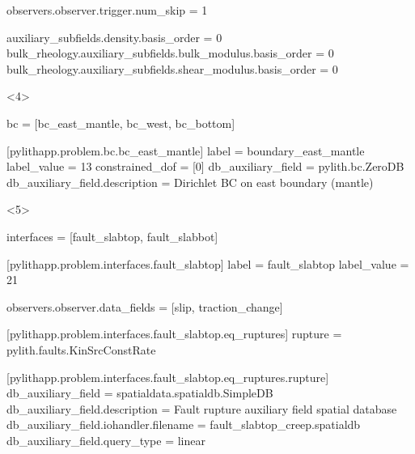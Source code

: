 \documentclass[aspectratio=169]{beamer}
\begin{document}
\begin{frame}[t,fragile]
\begin{minipage}[t]{0.67\textwidth}
\begin{onlyenv}
\begin{cfgcode}
        observers.observer.trigger.num_skip = 1

        auxiliary_subfields.density.basis_order = 0
        bulk_rheology.auxiliary_subfields.bulk_modulus.basis_order = 0
        bulk_rheology.auxiliary_subfields.shear_modulus.basis_order = 0
      \end{cfgcode}
    \end{onlyenv}
    \begin{onlyenv}<4>
      \begin{cfgcode}
        bc = [bc_east_mantle, bc_west, bc_bottom]

        [pylithapp.problem.bc.bc_east_mantle]
        label = boundary_east_mantle
        label_value = 13
        constrained_dof = [0]
        db_auxiliary_field = pylith.bc.ZeroDB
        db_auxiliary_field.description = Dirichlet BC on east boundary (mantle)
      \end{cfgcode}
    \end{onlyenv}
    \begin{onlyenv}<5>
      \begin{cfgcode}
        interfaces = [fault_slabtop, fault_slabbot]

        [pylithapp.problem.interfaces.fault_slabtop]
        label = fault_slabtop
        label_value = 21

        observers.observer.data_fields = [slip, traction_change]

        [pylithapp.problem.interfaces.fault_slabtop.eq_ruptures]
        rupture = pylith.faults.KinSrcConstRate

        [pylithapp.problem.interfaces.fault_slabtop.eq_ruptures.rupture]
        db_auxiliary_field = spatialdata.spatialdb.SimpleDB
        db_auxiliary_field.description = Fault rupture auxiliary field spatial database
        db_auxiliary_field.iohandler.filename = fault_slabtop_creep.spatialdb
        db_auxiliary_field.query_type = linear
      \end{cfgcode}
    \end{onlyenv}
  \end{minipage}

  
\end{frame}
\end{document}
